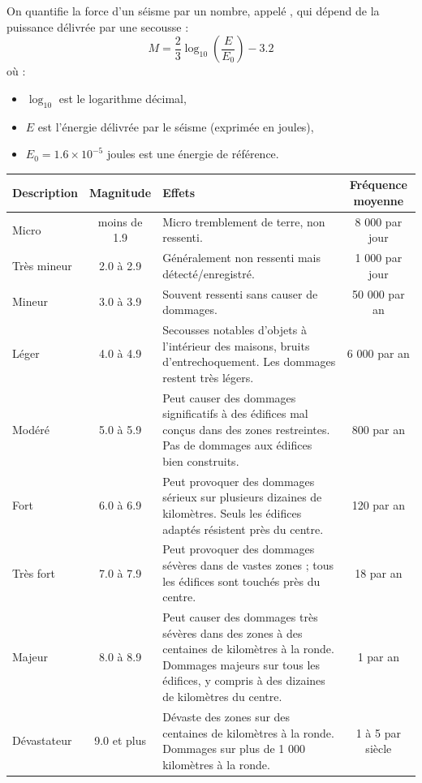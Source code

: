 \documentclass[11pt,class=report,crop=false]{standalone}
\begin{document}
\begin{activite}
   

On quantifie la force d'un séisme par un nombre, appelé , qui dépend de la puissance délivrée par une secousse :
$$M = \frac{2}{3} \log_{10} \left(\frac{E}{E_0} \right) - 3.2$$
où :
\begin{itemize}
  \item $\log_{10}$ est le logarithme décimal,
  \item $E$ est l'énergie délivrée par le séisme (exprimée en joules),
  \item $E_0 = 1.6 \times 10^{-5}$ joules est une énergie de référence.
\end{itemize}  
  
{
\small
\begin{center}
\begin{tabular}{|l|c|p{6cm}|c|}
\hline
Description &	Magnitude &	Effets &Fréquence moyenne \\ \hline\hline
Micro &	moins de 1.9 &	Micro tremblement de terre, non ressenti. &	8 000 par jour\\ \hline
Très mineur &	2.0 à 2.9 &	Généralement non ressenti mais détecté/enregistré. &	1 000 par jour\\ \hline
Mineur& 	3.0 à 3.9& 	Souvent ressenti sans causer de dommages. &	50 000 par an\\ \hline
Léger &	4.0 à 4.9 &	Secousses notables d'objets à l'intérieur des maisons, bruits d'entrechoquement. Les dommages restent très légers. &	6 000 par an\\ \hline
Modéré &	5.0 à 5.9 &	Peut causer des dommages significatifs à des édifices mal conçus dans des zones restreintes. Pas de dommages aux édifices bien construits. &	800 par an\\ \hline
Fort &	6.0 à 6.9 &	Peut provoquer des dommages sérieux sur plusieurs dizaines de kilomètres. Seuls les édifices adaptés résistent près du centre. &	120 par an\\ \hline
Très fort &	7.0 à 7.9 &	Peut provoquer des dommages sévères dans de vastes zones ; tous les édifices sont touchés près du centre. &	18 par an\\ \hline
Majeur &	8.0 à 8.9 &	Peut causer des dommages très sévères dans des zones à des centaines de kilomètres à la ronde. Dommages majeurs sur tous les édifices, y compris à des dizaines de kilomètres du centre. &	1 par an\\ \hline
Dévastateur & 9.0 et plus &	Dévaste des zones sur des centaines de kilomètres à la ronde. Dommages sur plus de 1 000 kilomètres à la ronde. &	1 à 5 par siècle \\ \hline
\end{tabular}


\end{center}}
\end{activite}
\end{document}
